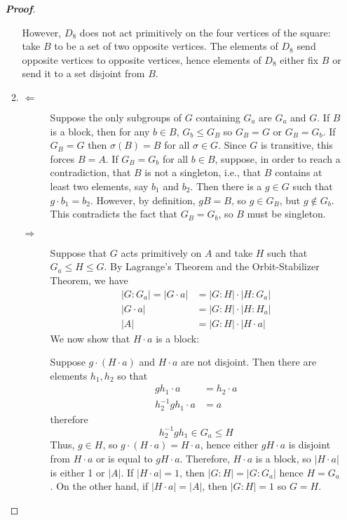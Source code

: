 \documentclass[12pt,leqno]{book}
\theoremstyle{definition}
\newenvironment{Proof}{\begin{proof}[\textnormal{\textbf{Proof}}]}{\end{proof}}
\begin{document}
\begin{enumerate}
\begin{Proof}
\begin{enumerate}
However, $D_8$ does not act primitively on the four vertices of the square: take $B$ to be a set of two opposite vertices. The elements of $D_8$ send opposite vertices to opposite vertices, hence elements of $D_8$ either fix $B$ or send it to a set disjoint from $B$.
  \item \begin{description}
         \item [$\Leftarrow$] Suppose the only subgroups of $G$ containing $G_a$ are $G_a$ and $G$. If $B$ is a block, then for any $b\in B$, $G_b\leq G_B$ so $G_B=G$ or $G_B=G_b$. If $G_B=G$ then $\sigma(B)=B$ for all $\sigma\in G$. Since $G$ is transitive, this forces $B=A$. If $G_B=G_b$ for all $b\in B$, suppose, in order to reach a contradiction, that $B$ is not a singleton, i.e., that $B$ contains at least two elements, say $b_1$ and $b_2$. Then there is a $g\in G$ such that $g\cdot b_1=b_2$. However, by definition, $gB=B$, so $g\in G_B$, but $g\notin G_b$. This contradicts the fact that $G_B=G_b$, so $B$ must be singleton.  
         \item [$\Rightarrow$] Suppose that $G$ acts primitively on $A$ and take $H$ such that $G_a\leq H\leq G$. By Lagrange's Theorem and the Orbit-Stabilizer Theorem, we have \begin{align*}|G:G_a|=|G\cdot a|&=|G:H|\cdot|H:G_a|\\|G\cdot a|&=|G:H|\cdot|H:H_a|\\|A|&=|G:H|\cdot|H\cdot a|\end{align*} We now show that $H\cdot a$ is a block:

Suppose $g\cdot(H\cdot a)$ and $H\cdot a$ are not disjoint. Then there are elements $h_1,h_2$ so that \begin{align*}gh_1\cdot a&=h_2\cdot a\\h_2^{-1}gh_1\cdot a&=a\end{align*} therefore \[h_2^{-1}gh_1\in G_a\leq H\] Thus, $g\in H$, so $g\cdot(H\cdot a)=H\cdot a$, hence either $gH\cdot a$ is disjoint from $H\cdot a$ or is equal to $gH\cdot a$. Therefore, $H\cdot a$ is a block, so $|H\cdot a|$ is either 1 or $|A|$. If $|H\cdot a|=1$, then $|G:H|=|G:G_a|$ hence $H=G_a$. On the other hand, if $|H\cdot a|=|A|$, then $|G:H|=1$ so $G=H$. 
        \end{description}
 \end{enumerate}
\end{Proof}

\end{enumerate}
\end{document}
